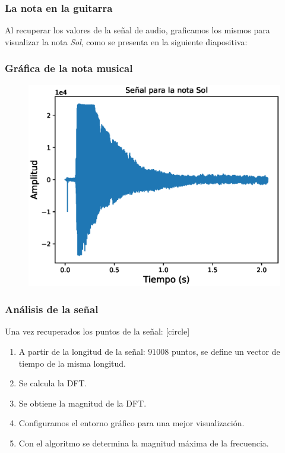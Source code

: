 \documentclass[12pt]{beamer}
\begin{document}
\begin{frame}
\frametitle{La nota en la guitarra}
Al recuperar los valores de la señal de audio, graficamos los mismos para visualizar la nota \emph{Sol}, como se presenta en la siguiente diapositiva:
\end{frame}
\begin{frame}
\frametitle{Gráfica de la nota musical}
\begin{figure}
    \centering
    \includegraphics[scale=0.6]{Imagenes/DFT_Analisis_Senal_Audio_01.eps}
\end{figure}
\end{frame}
\begin{frame}
\frametitle{Análisis de la señal}
Una vez recuperados los puntos de la señal:
[circle]
\begin{enumerate}[<+->]
\item A partir de la longitud de la señal: $91008$ puntos, se define un vector de tiempo de la misma longitud.
\item Se calcula la DFT.
\item Se obtiene la magnitud de la DFT.
\item Configuramos el entorno gráfico para una mejor visualización.
\item Con el algoritmo se determina la magnitud máxima de la frecuencia.
\end{enumerate}
\end{frame}
\end{document}
